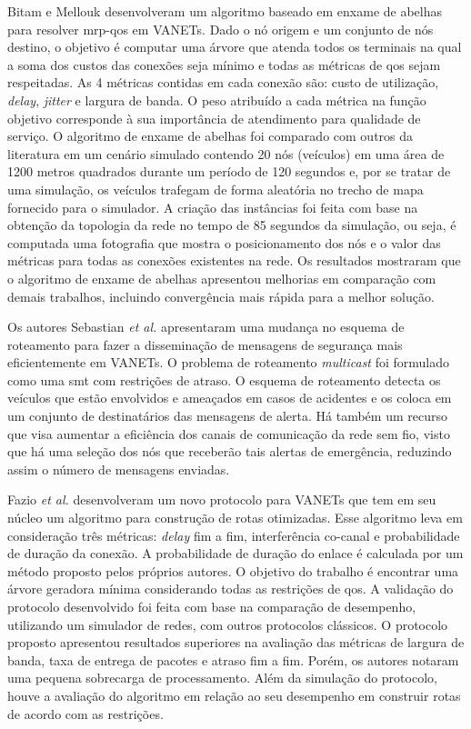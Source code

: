 Bitam e Mellouk \cite{BITAM2013981} desenvolveram um algoritmo baseado
em enxame de abelhas para resolver  \gls{mrp-qos} em VANETs. Dado o nó
origem e um conjunto de nós  destino, o objetivo é computar uma árvore
que atenda todos  os terminais na qual a soma  dos custos das conexões
seja mínimo e todas as métricas  de \gls{qos} sejam respeitadas.  As 4
métricas  contidas   em  cada   conexão  são:  custo   de  utilização,
\textit{delay}, \textit{jitter} e largura de banda. O peso atribuído a
cada  métrica na  função  objetivo corresponde  à  sua importância  de
atendimento  para qualidade  de  serviço.  O  algoritmo  de enxame  de
abelhas foi comparado com outros  da literatura em um cenário simulado
contendo  20 nós  (veículos)  em  uma área  de  1200 metros  quadrados
durante um período de 120 segundos  e, por se tratar de uma simulação,
os veículos  trafegam de forma  aleatória no trecho de  mapa fornecido
para o  simulador.  A  criação das  instâncias foi  feita com  base na
obtenção da topologia da rede no tempo de 85 segundos da simulação, ou
seja, é computada uma fotografia que mostra o posicionamento dos nós e
o valor  das métricas para todas  as conexões existentes na  rede.  Os
resultados mostraram que  o algoritmo de enxame  de abelhas apresentou
melhorias em  comparação com demais trabalhos,  incluindo convergência
mais rápida para a melhor solução.

Os  autores Sebastian  {\em et  al.}  \cite{5506245}  apresentaram uma
mudança  no  esquema  de  roteamento  para  fazer  a  disseminação  de
mensagens de  segurança mais eficientemente  em VANETs. O  problema de
roteamento  \textit{multicast} foi  formulado como  uma \gls{smt}  com
restrições de atraso.  O esquema de roteamento detecta os veículos que
estão envolvidos e  ameaçados em casos de acidentes e  os coloca em um
conjunto  de destinatários  das  mensagens de  alerta.   Há também  um
recurso que  visa aumentar a  eficiência dos canais de  comunicação da
rede sem  fio, visto  que há  uma seleção dos  nós que  receberão tais
alertas de emergência, reduzindo assim o número de mensagens enviadas.

Fazio {\em et al.}   \cite{fazio:2013} desenvolveram um novo protocolo
para VANETs  que tem  em seu  núcleo um  algoritmo para  construção de
rotas otimizadas.  Esse algoritmo  leva em consideração três métricas:
\textit{delay} fim  a fim,  interferência co-canal e  probabilidade de
duração da conexão.  A probabilidade  de duração do enlace é calculada
por um método proposto pelos  próprios autores. O objetivo do trabalho
é  encontrar   uma  árvore  geradora  mínima   considerando  todas  as
restrições de  \gls{qos}.  A  validação do protocolo  desenvolvido foi
feita com base na comparação de desempenho, utilizando um simulador de
redes,  com   outros  protocolos  clássicos.   O   protocolo  proposto
apresentou resultados superiores na  avaliação das métricas de largura
de banda, taxa  de entrega de pacotes  e atraso fim a  fim.  Porém, os
autores  notaram uma  pequena  sobrecarga de  processamento.  Além  da
simulação do protocolo,  houve a avaliação do algoritmo  em relação ao
seu desempenho em construir rotas de acordo com as restrições.

